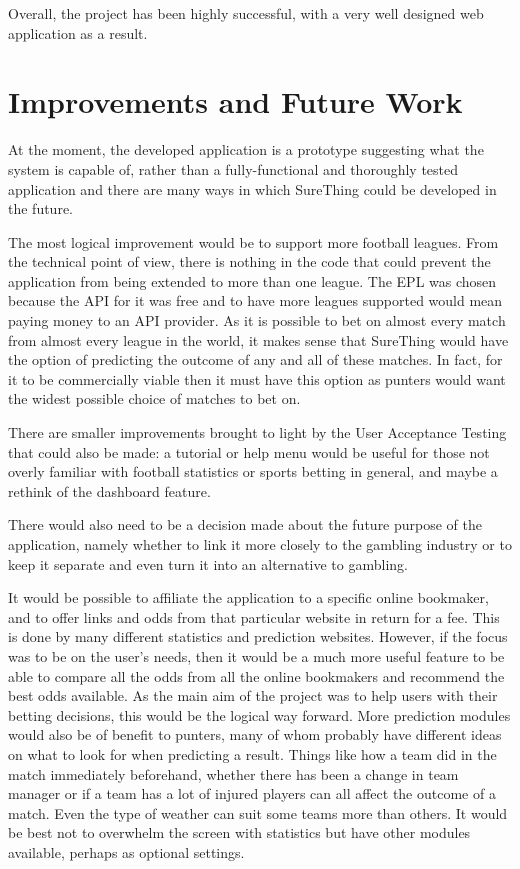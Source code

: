 Overall, the project has been highly successful, with a very well designed web application as a result.

\section{Improvements and Future Work}
\label{sec:improvements_conclusion}
At the moment, the developed application is a prototype suggesting what the system is capable of, rather than a fully-functional and thoroughly tested application and there are many ways in which SureThing could be developed in the future.

The most logical improvement would be to support more football leagues. From the technical point of view, there is nothing in the code that could prevent the application from being extended to more than one league. The EPL was chosen because the API for it was free and to have more leagues supported would mean paying money to an API provider. As it is possible to bet on almost every match from almost every league in the world, it makes sense that SureThing would have the option of predicting the outcome of any and all of these matches. In fact, for it to be commercially viable then it must have this option as punters would want the widest possible choice of matches to bet on.

There are smaller improvements brought to light by the User Acceptance Testing that could also be made: a tutorial or help menu would be useful for those not overly familiar with football statistics or sports betting in general, and maybe a rethink of the dashboard feature.

There would also need to be a decision made about the future purpose of the application, namely whether to link it more closely to the gambling industry or to keep it separate and even turn it into an alternative to gambling.  

It would be possible to affiliate the application to a specific online bookmaker, and to offer links and odds from that particular website in return for a fee. This is done by many different statistics and prediction websites. However, if the focus was to be on the user's needs, then it would be a much more useful feature to be able to compare all the odds from all the online bookmakers and recommend the best odds available. As the main aim of the project was to help users with their betting decisions, this would be the logical way forward. More prediction modules would also be of benefit to punters, many of whom probably have different ideas on what to look for when predicting a result. Things like how a team did in the match immediately beforehand, whether there has been a change in team manager or if a team has a lot of injured players can all affect the outcome of a match. Even the type of weather can suit some teams more than others. It would be best not to overwhelm the screen with statistics but have other modules available, perhaps as optional settings. 

